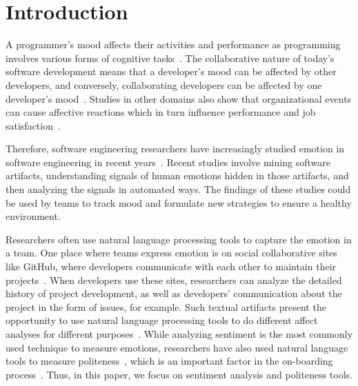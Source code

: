 \section{Introduction}

A programmer's mood affects their activities and performance as programming involves various forms of cognitive tasks~\cite{khan2011moods}. 
The collaborative nature of today's software development
means that a developer's mood can be affected by other
developers, and conversely, collaborating developers can be 
affected by one developer's 
mood~\cite{murgia2014developers,graziotin2014happy,curtis1988field}. 
Studies in other domains also show that organizational events can cause affective reactions which in turn influence performance and job satisfaction~\cite{parkinson1996changing}. 

Therefore, software engineering researchers have increasingly studied emotion in software engineering in recent years~\cite{jongeling2017negative}. 
Recent studies involve 
mining software artifacts, 
understanding signals of human emotions hidden in those artifacts, and 
then analyzing the signals in automated ways. 
The findings of these studies could be used by teams to 
track mood and formulate new strategies to ensure 
a healthy environment.


Researchers often use natural language processing tools to capture the emotion in a team.
One place where teams express emotion is on social collaborative sites
like GitHub, where
developers communicate with each other to maintain their projects~\cite{storey2010impact}. 
When developers use these sites, 
researchers can analyze the detailed history of project development, 
as well as developers' communication about the project in the form of issues, for example. 
Such textual artifacts present the opportunity 
to use natural language processing tools 
to do different affect analyses 
for different purposes~\cite{ortu2015bullies,ebert2017confusion,gachechiladze2017anger}. 
While analyzing sentiment is the most commonly used technique to measure emotions, 
researchers have also used natural language tools to measure 
politeness~\cite{ortu2015bullies}, which is an important 
factor in the on-boarding process~\cite{steinmacher2015social}.
Thus, in this paper, we focus on sentiment analysis and 
politeness tools. 

